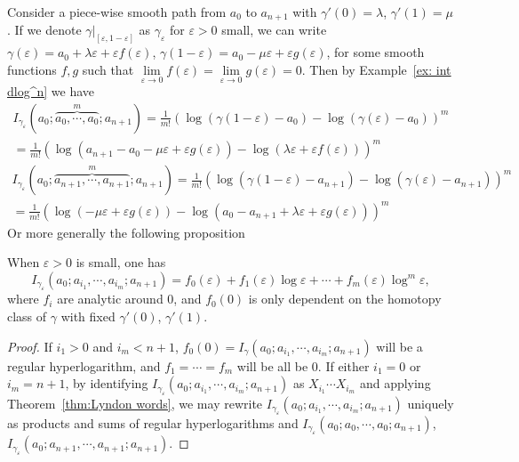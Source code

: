 Consider a piece-wise smooth path from $a_0$ to $a_{n+1}$ with $\gamma'(0)=\lambda$, $\gamma'(1)=\mu$. If we denote $\gamma|_{[\varepsilon,1-\varepsilon]}$ as $\gamma_\varepsilon$ for $\varepsilon>0$ small, we can write $\gamma(\varepsilon)=a_0+\lambda\varepsilon+\varepsilon f(\varepsilon)$, $\gamma(1-\varepsilon)=a_0-\mu\varepsilon+\varepsilon g(\varepsilon)$, for some smooth functions $f,g$ such that $\lim\limits_{\varepsilon\to0}f(\varepsilon)=\lim\limits_{\varepsilon\to0}g(\varepsilon)=0$. Then by Example~\ref{ex: int dlog^n} we have
\begin{multline}
I_{\gamma_\varepsilon}(a_0;\overbrace{a_0,\cdots,a_0}^{m};a_{n+1})=\frac{1}{m!}\left(\log(\gamma(1-\varepsilon)-a_0)-\log(\gamma(\varepsilon)-a_0)\right)^m\\
=\frac{1}{m!}\left(\log(a_{n+1}-a_0-\mu\varepsilon+\varepsilon g(\varepsilon))-\log(\lambda\varepsilon+\varepsilon f(\varepsilon))\right)^m
\end{multline}
\begin{multline}
I_{\gamma_\varepsilon}(a_0;\overbrace{a_{n+1},\cdots,a_{n+1}}^m;a_{n+1})=\frac{1}{m!}\left(\log(\gamma(1-\varepsilon)-a_{n+1})-\log(\gamma(\varepsilon)-a_{n+1})\right)^m\\
=\frac{1}{m!}\left(\log(-\mu\varepsilon+\varepsilon g(\varepsilon))-\log(a_0-a_{n+1}+\lambda\varepsilon+\varepsilon g(\varepsilon))\right)^m
\end{multline}
Or more generally the following proposition

\begin{proposition}\label{prop: I_epsilon = O(log^m(epsilon))}
When $\varepsilon>0$ is small, one has
\[
I_{\gamma_\varepsilon}(a_0;a_{i_1},\cdots,a_{i_m};a_{n+1})=f_0(\varepsilon)+f_1(\varepsilon)\log\varepsilon+\cdots+f_m(\varepsilon)\log^m\varepsilon,
\]
where $f_i$ are analytic around $0$, and $f_0(0)$ is only dependent on the homotopy class of $\gamma$ with fixed $\gamma'(0)$, $\gamma'(1)$.
\end{proposition}

\begin{proof}
If $i_1>0$ and $i_m<n+1$, $f_0(0)=I_{\gamma}(a_0;a_{i_1},\cdots,a_{i_m};a_{n+1})$ will be a regular hyperlogarithm, and $f_1=\cdots=f_m$ will be all be 0. If either $i_1=0$ or $i_m=n+1$, by identifying $I_{\gamma_\varepsilon}(a_0;a_{i_1},\cdots,a_{i_m};a_{n+1})$ as $X_{i_1}\cdots X_{i_m}$ and applying Theorem~\ref{thm:Lyndon words}, we may rewrite $I_{\gamma_\varepsilon}(a_0;a_{i_1},\cdots,a_{i_m};a_{n+1})$ uniquely as products and sums of regular hyperlogarithms and $I_{\gamma_\varepsilon}(a_0;a_0,\cdots,a_0;a_{n+1})$, $I_{\gamma_\varepsilon}(a_0;a_{n+1},\cdots,a_{n+1};a_{n+1})$.
\end{proof}

